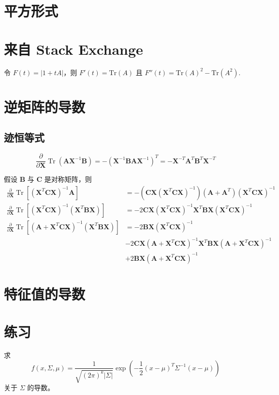 \section{平方形式}
 
\section{来自 Stack Exchange}

令 $F(t)=|1+t A|$，则
$F'(t) = \mathrm{Tr}(A)$ 且
$F''(t) = \mathrm{Tr}(A)^2 - \mathrm{Tr}(A^2)$.

\section{逆矩阵的导数}


\subsection{迹恒等式}
$$
\frac{\partial}{\partial \mathbf{X}} \operatorname{Tr}\left(\mathbf{A} \mathbf{X}^{-1} \mathbf{B}\right)=-\left(\mathbf{X}^{-1} \mathbf{B} \mathbf{A} \mathbf{X}^{-1}\right)^T=-\mathbf{X}^{-T} \mathbf{A}^T \mathbf{B}^T \mathbf{X}^{-T}
$$

假设 $\mathbf{B}$ 与 $\mathbf{C}$ 是对称矩阵，则
$$
\begin{aligned}
\frac{\partial}{\partial \mathbf{X}} \operatorname{Tr}\left[\left(\mathbf{X}^T \mathbf{C X}\right)^{-1} \mathbf{A}\right] & =-\left(\mathbf{C X}\left(\mathbf{X}^T \mathbf{C X}\right)^{-1}\right)\left(\mathbf{A}+\mathbf{A}^T\right)\left(\mathbf{X}^T \mathbf{C X}\right)^{-1} \\
\frac{\partial}{\partial \mathbf{X}} \operatorname{Tr}\left[\left(\mathbf{X}^T \mathbf{C X}\right)^{-1}\left(\mathbf{X}^T \mathbf{B X}\right)\right] & =-2 \mathbf{C X}\left(\mathbf{X}^T \mathbf{C X}\right)^{-1} \mathbf{X}^T \mathbf{B X}\left(\mathbf{X}^T \mathbf{C X}\right)^{-1} \\
\frac{\partial}{\partial \mathbf{X}} \operatorname{Tr}\left[\left(\mathbf{A}+\mathbf{X}^T \mathbf{C X}\right)^{-1}\left(\mathbf{X}^T \mathbf{B X}\right)\right] & =-2 \mathbf{B X}\left(\mathbf{X}^T \mathbf{C X}\right)^{-1} \\
& -2 \mathbf{C X}\left(\mathbf{A}+\mathbf{X}^T \mathbf{C X}\right)^{-1} \mathbf{X}^T \mathbf{B X}\left(\mathbf{A}+\mathbf{X}^T \mathbf{C X}\right)^{-1} \\
& +2 \mathbf{B X}\left(\mathbf{A}+\mathbf{X}^T \mathbf{C X}\right)^{-1}
\end{aligned}
$$

\section{特征值的导数}

\section{练习}
\begin{exercise}
   求
\[
   f(x,\Sigma,\mu) = \frac{1}{\sqrt{(2\pi)^k|\Sigma|}}
   \exp\left(-\frac12(x-\mu)^T \Sigma^{-1} (x-\mu)\right)
\]
   关于 $\Sigma$ 的导数。
\end{exercise}
